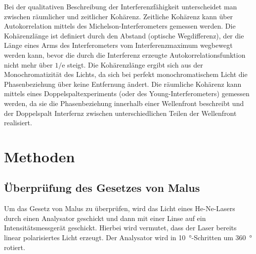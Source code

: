 \documentclass[
	a4paper,
	12pt,
	pagesize,
	ngerman
]{scrartcl}
\begin{document}
	Bei der qualitativen Beschreibung der Interferenzfähigkeit unterscheidet man zwischen räumlicher und zeitlicher Kohärenz.
	Zeitliche Kohärenz kann über Autokorrelation mittels des Michelson-Interferometers gemessen werden.
	Die Kohärenzlänge ist definiert durch den Abstand (optische Wegdifferenz), der die Länge eines Arms des Interferometers vom Interferenzmaximum wegbewegt werden kann, bevor die durch die Interferenz erzeugte Autokorrelationsfunktion nicht mehr über $1/\text{e}$ steigt.
	Die Kohärenzlänge ergibt sich aus der Monochromatizität des Lichts, da sich bei perfekt monochromatischem Licht die Phasenbeziehung über keine Entfernung ändert.
	Die räumliche Kohärenz kann mittels eines Doppelspaltexperiments (oder des Young-Interferometers) gemessen werden, da sie die Phasenbeziehung innerhalb einer Wellenfront beschreibt und der Doppelspalt Interfernz zwischen unterschiedlichen Teilen der Wellenfront realisiert.


	\section{Methoden}

	\subsection{Überprüfung des Gesetzes von Malus}
	Um das Gesetz von Malus zu überprüfen, wird das Licht eines He-Ne-Lasers durch einen Analysator geschickt und dann mit einer Linse auf ein Intensitätsmessgerät geschickt. %
	Hierbei wird vermutet, dass der Laser bereits linear polarisiertes Licht erzeugt.
	Der Analysator wird in \SI{10}{\degree}-Schritten um \SI{360}{\degree} rotiert.
\end{document}
